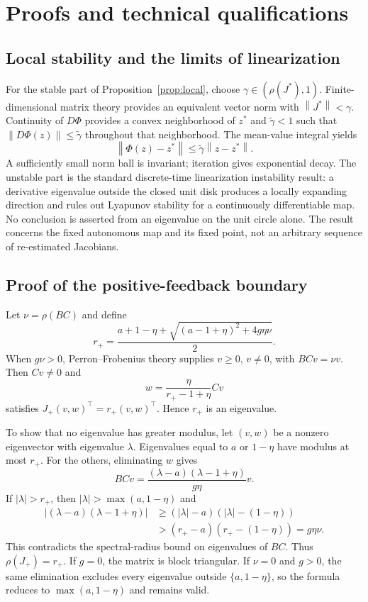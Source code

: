 \documentclass[10pt,twocolumn,letterpaper]{article}
\theoremstyle{definition}
\theoremstyle{remark}
\newcommand{\norm}[1]{\left\lVert #1\right\rVert}
\begin{document}
\clearpage
\appendix
\section{Proofs and technical qualifications}
\label{app:proofs}
\subsection{Local stability and the limits of linearization}
For the stable part of Proposition~\ref{prop:local}, choose $\gamma\in(\rho(J^*),1)$. Finite-dimensional matrix theory provides an equivalent vector norm with $\norm{J^*}<\gamma$. Continuity of $D\Phi$ provides a convex neighborhood of $z^*$ and $\widetilde\gamma<1$ such that $\norm{D\Phi(z)}\leq\widetilde\gamma$ throughout that neighborhood. The mean-value integral yields
\begin{equation}
 \norm{\Phi(z)-z^*}\leq\widetilde\gamma\norm{z-z^*}.
\end{equation}
A sufficiently small norm ball is invariant; iteration gives exponential decay. The unstable part is the standard discrete-time linearization instability result: a derivative eigenvalue outside the closed unit disk produces a locally expanding direction and rules out Lyapunov stability for a continuously differentiable map. No conclusion is asserted from an eigenvalue on the unit circle alone. The result concerns the fixed autonomous map and its fixed point, not an arbitrary sequence of re-estimated Jacobians.

\subsection{Proof of the positive-feedback boundary}
\label{app:positiveproof}
Let $\nu=\rho(BC)$ and define
\begin{equation}
 r_+=\frac{a+1-\eta+\sqrt{(a-1+\eta)^2+4g\eta\nu}}{2}.
\end{equation}
When $g\nu>0$, Perron--Frobenius theory supplies $v\geq0$, $v\ne0$, with $BCv=\nu v$. Then $Cv\ne0$ and
\begin{equation}
 w=\frac{\eta}{r_+-1+\eta}Cv
\end{equation}
satisfies $J_+(v,w)^\top=r_+(v,w)^\top$. Hence $r_+$ is an eigenvalue.

To show that no eigenvalue has greater modulus, let $(v,w)$ be a nonzero eigenvector with eigenvalue $\lambda$. Eigenvalues equal to $a$ or $1-\eta$ have modulus at most $r_+$. For the others, eliminating $w$ gives
\begin{equation}
 BCv=\frac{(\lambda-a)(\lambda-1+\eta)}{g\eta}v.
\end{equation}
If $|\lambda|>r_+$, then $|\lambda|>\max(a,1-\eta)$ and
\begin{align}
 |(\lambda-a)(\lambda-1+\eta)|
 &\geq(|\lambda|-a)(|\lambda|-(1-\eta))\\
 &>(r_+-a)(r_+-(1-\eta))=g\eta\nu.
\end{align}
This contradicts the spectral-radius bound on eigenvalues of $BC$. Thus $\rho(J_+)=r_+$. If $g=0$, the matrix is block triangular. If $\nu=0$ and $g>0$, the same elimination excludes every eigenvalue outside $\{a,1-\eta\}$, so the formula reduces to $\max(a,1-\eta)$ and remains valid.
\end{document}
